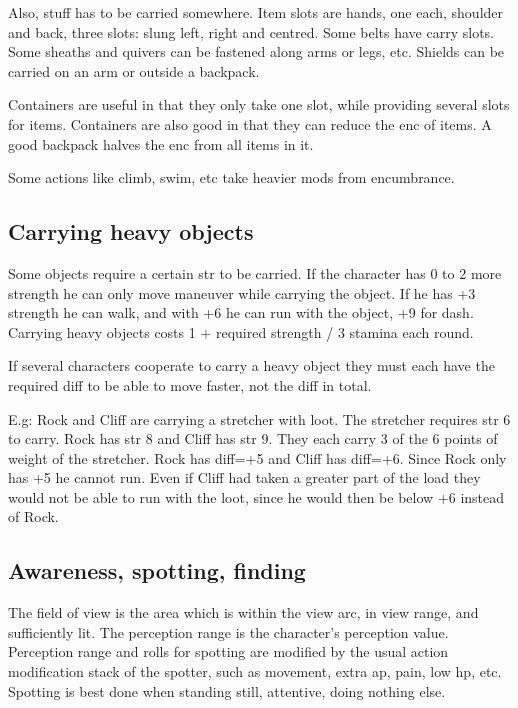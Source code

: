 Also, stuff has to be carried somewhere. Item slots are hands, one each, shoulder and back, three slots: slung left, right and centred. Some belts have carry slots. Some sheaths and quivers can be fastened along arms or legs, etc. Shields can be carried on an arm or outside a backpack.

Containers are useful in that they only take one slot, while providing several slots for items. Containers are also good in that they can reduce the enc of items. A good backpack halves the enc from all items in it.

Some actions like climb, swim, etc take heavier mods from encumbrance.


\subsection*{Carrying heavy objects}
Some objects require a certain str to be carried. If the character has 0 to 2 more strength he can only move maneuver while carrying the object. If he has +3 strength he can walk, and with +6 he can run with the object, +9 for dash.
Carrying heavy objects costs 1 + required strength / 3 stamina each round.

If several characters cooperate to carry a heavy object they must each have the required diff to be able to move faster, not the diff in total.

E.g: Rock and Cliff are carrying a stretcher with loot. The stretcher requires str 6 to carry. Rock has str 8 and Cliff has str 9. They each carry 3 of the 6 points of weight of the stretcher. Rock has diff=+5 and Cliff has diff=+6. Since Rock only has +5 he cannot run. Even if Cliff had taken a greater part of the load they would not be able to run with the loot, since he would then be below +6 instead of Rock.










\subsection*{Awareness, spotting, finding}
The field of view is the area which is within the view arc, in view range, and sufficiently lit. The perception range is the character's perception value. Perception range and rolls for spotting are modified by the usual action modification stack of the spotter, such as movement, extra ap, pain, low hp, etc. Spotting is best done when standing still, attentive, doing nothing else.


